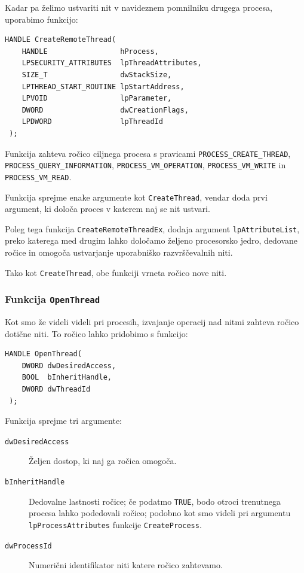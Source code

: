 \documentclass[a4paper,12pt,openright]{book}
\begin{document}
Kadar pa želimo ustvariti nit v navideznem pomnilniku drugega procesa, uporabimo funkcijo:
\begin{lstlisting}[style=func]
 HANDLE CreateRemoteThread(
	HANDLE                 hProcess,
	LPSECURITY_ATTRIBUTES  lpThreadAttributes,
	SIZE_T                 dwStackSize,
	LPTHREAD_START_ROUTINE lpStartAddress,
	LPVOID                 lpParameter,
	DWORD                  dwCreationFlags,
	LPDWORD                lpThreadId
 );
\end{lstlisting}

Funkcija zahteva ročico ciljnega procesa s pravicami \texttt{PROCESS\_CREATE\-\_THREAD}, \texttt{PROCESS\_QUERY\_INFORMATION}, \texttt{PROCESS\_VM\-\_OPERATION}, \texttt{PROCESS\-\_VM\_WRITE} in \texttt{PROCESS\_VM\_READ}.

Funkcija sprejme enake argumente kot \texttt{CreateThread}, vendar doda prvi argument, ki določa proces v katerem naj se nit ustvari.

Poleg tega funkcija \texttt{CreateRemoteThreadEx}, dodaja argument \texttt{lpAttributeList}, preko katerega med drugim lahko določamo željeno procesorsko jedro, dedovane ročice in omogoča ustvarjanje uporabniško razvrščevalnih niti.

Tako kot \texttt{CreateThread}, obe funkciji vrneta ročico nove niti.

\subsubsection{Funkcija \texttt{OpenThread}}

Kot smo že videli videli pri procesih, izvajanje operacij nad nitmi zahteva ročico dotične niti.
To ročico lahko pridobimo s funkcijo:
\begin{lstlisting}[style=func]
 HANDLE OpenThread(
	DWORD dwDesiredAccess,
	BOOL  bInheritHandle,
	DWORD dwThreadId
 );
\end{lstlisting}

Funkcija sprejme tri argumente:
\begin{description}
	\item[\texttt{dwDesiredAccess}] Željen dostop, ki naj ga ročica omogoča.
	\item[\texttt{bInheritHandle}] Dedovalne lastnosti ročice; če podatmo \texttt{TRUE}, bodo otroci trenutnega procesa lahko podedovali ročico; podobno kot smo videli pri argumentu \texttt{lpProcessAttributes} funkcije \texttt{CreateProcess}.
	\item[\texttt{dwProcessId}] Numerični identifikator niti katere ročico zahtevamo.
\end{description}
\end{document}
